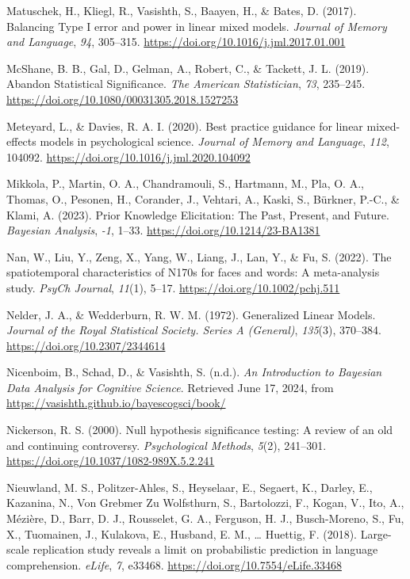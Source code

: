 \documentclass[
  doc,12pt,floatsintext]{apa7}
\newlength{\cslhangindent}
\newenvironment{CSLReferences}[2] %
 {\begin{list}{}{%
  \setlength{\itemindent}{0pt}
  \setlength{\leftmargin}{0pt}
  \setlength{\parsep}{0pt}
  \ifodd #1
   \setlength{\leftmargin}{\cslhangindent}
   \setlength{\itemindent}{-1\cslhangindent}
  \fi
  \setlength{\itemsep}{#2\baselineskip}}}
 {\end{list}}
\begin{document}
\begin{CSLReferences}{1}{0}
Matuschek, H., Kliegl, R., Vasishth, S., Baayen, H., \& Bates, D. (2017). Balancing {Type I} error and power in linear mixed models. \emph{Journal of Memory and Language}, \emph{94}, 305--315. \url{https://doi.org/10.1016/j.jml.2017.01.001}

McShane, B. B., Gal, D., Gelman, A., Robert, C., \& Tackett, J. L. (2019). Abandon {Statistical Significance}. \emph{The American Statistician}, \emph{73}, 235--245. \url{https://doi.org/10.1080/00031305.2018.1527253}

Meteyard, L., \& Davies, R. A. I. (2020). Best practice guidance for linear mixed-effects models in psychological science. \emph{Journal of Memory and Language}, \emph{112}, 104092. \url{https://doi.org/10.1016/j.jml.2020.104092}

Mikkola, P., Martin, O. A., Chandramouli, S., Hartmann, M., Pla, O. A., Thomas, O., Pesonen, H., Corander, J., Vehtari, A., Kaski, S., Bürkner, P.-C., \& Klami, A. (2023). Prior {Knowledge Elicitation}: {The Past}, {Present}, and {Future}. \emph{Bayesian Analysis}, \emph{-1}, 1--33. \url{https://doi.org/10.1214/23-BA1381}

Nan, W., Liu, Y., Zeng, X., Yang, W., Liang, J., Lan, Y., \& Fu, S. (2022). The spatiotemporal characteristics of {N170s} for faces and words: {A} meta-analysis study. \emph{PsyCh Journal}, \emph{11}(1), 5--17. \url{https://doi.org/10.1002/pchj.511}

Nelder, J. A., \& Wedderburn, R. W. M. (1972). Generalized {Linear Models}. \emph{Journal of the Royal Statistical Society. Series A (General)}, \emph{135}(3), 370--384. \url{https://doi.org/10.2307/2344614}

Nicenboim, B., Schad, D., \& Vasishth, S. (n.d.). \emph{An {Introduction} to {Bayesian Data Analysis} for {Cognitive Science}}. Retrieved June 17, 2024, from \url{https://vasishth.github.io/bayescogsci/book/}

Nickerson, R. S. (2000). Null hypothesis significance testing: {A} review of an old and continuing controversy. \emph{Psychological Methods}, \emph{5}(2), 241--301. \url{https://doi.org/10.1037/1082-989X.5.2.241}

Nieuwland, M. S., Politzer-Ahles, S., Heyselaar, E., Segaert, K., Darley, E., Kazanina, N., Von Grebmer Zu Wolfsthurn, S., Bartolozzi, F., Kogan, V., Ito, A., Mézière, D., Barr, D. J., Rousselet, G. A., Ferguson, H. J., Busch-Moreno, S., Fu, X., Tuomainen, J., Kulakova, E., Husband, E. M., \ldots{} Huettig, F. (2018). Large-scale replication study reveals a limit on probabilistic prediction in language comprehension. \emph{eLife}, \emph{7}, e33468. \url{https://doi.org/10.7554/eLife.33468}


\end{CSLReferences}
\end{document}
